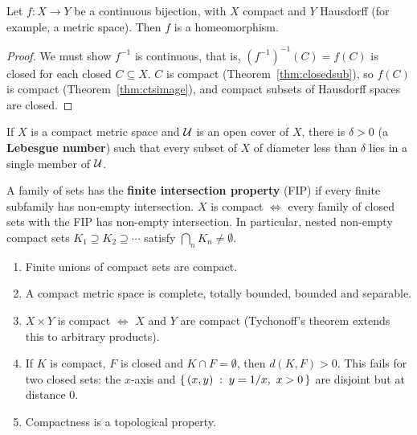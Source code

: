 \begin{theorem}\label{thm:cpt-haus}
Let $f\colon X\to Y$ be a continuous bijection, with $X$ compact and $Y$ Hausdorff (for example, a metric space). Then $f$ is a homeomorphism.
\end{theorem}
\begin{proof}
We must show $f^{-1}$ is continuous, that is, $(f^{-1})^{-1}(C)=f(C)$ is closed for each closed $C\subseteq X$. $C$ is compact (Theorem~\ref{thm:closedsub}), so $f(C)$ is compact (Theorem~\ref{thm:ctsimage}), and compact subsets of Hausdorff spaces are closed.
\end{proof}

\begin{lemma}\label{lem:lebesgue}
If $X$ is a compact metric space and $\mathcal{U}$ is an open cover of $X$, there is $\delta>0$ (a \textbf{Lebesgue number}) such that every subset of $X$ of diameter less than $\delta$ lies in a single member of $\mathcal{U}$.
\end{lemma}

\begin{theorem}\label{thm:fip}
A family of sets has the \textbf{finite intersection property} (FIP) if every finite subfamily has non-empty intersection. $X$ is compact $\iff$ every family of closed sets with the FIP has non-empty intersection. In particular, nested non-empty compact sets $K_1\supseteq K_2\supseteq\cdots$ satisfy $\bigcap_nK_n\ne\emptyset$.
\end{theorem}

\begin{proposition}
\leavevmode
\begin{enumerate}[label=(\roman*)]
  \item Finite unions of compact sets are compact.
  \item A compact metric space is complete, totally bounded, bounded and separable.
  \item $X\times Y$ is compact $\iff$ $X$ and $Y$ are compact (Tychonoff's theorem extends this to arbitrary products).
  \item If $K$ is compact, $F$ is closed and $K\cap F=\emptyset$, then $d(K,F)>0$. This fails for two closed sets: the $x$-axis and $\left\{\, (x,y) \;:\; y=1/x,\ x>0 \,\right\}$ are disjoint but at distance $0$.
  \item Compactness is a topological property.
\end{enumerate}
\end{proposition}

